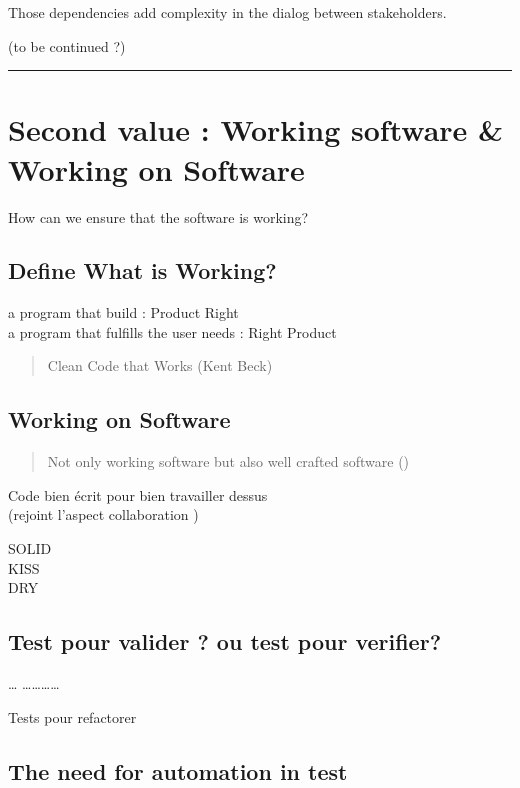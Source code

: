 Those dependencies add complexity in the dialog between stakeholders.

(to be continued ?)

\begin{center}\rule{3in}{0.4pt}\end{center}

\section{Second value : Working software \& Working on
Software}\label{second-value-working-software-working-on-software}

How can we ensure that the software is working?

\subsection{Define What is Working?}\label{define-what-is-working}

a program that build : Product Right\\a program that fulfills the user
needs : Right Product

\begin{quote}
Clean Code that Works (Kent Beck)
\end{quote}

\subsection{Working on Software}\label{working-on-software}

\begin{quote}
Not only working software but also well crafted software ()
\end{quote}

Code bien écrit pour bien travailler dessus\\(rejoint l'aspect
collaboration )

SOLID\\KISS\\DRY

\subsection{Test pour valider ? ou test pour
verifier?}\label{test-pour-valider-ou-test-pour-verifier}

\ldots{} \ldots{}\ldots{}\ldots{}\ldots{}

Tests pour refactorer

\subsection{The need for automation in
test}\label{the-need-for-automation-in-test}

